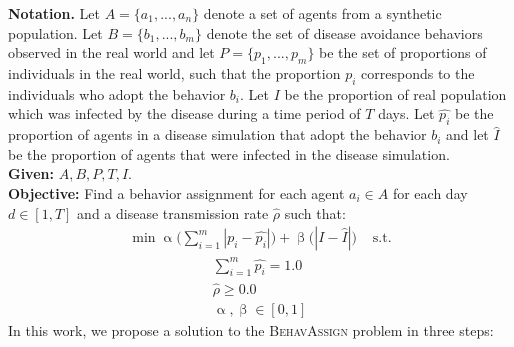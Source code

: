 \documentclass[doublespace]{VTthesis}
\begin{document}
    \textbf{Notation.}
    Let $A = \{a_1, ..., a_n\}$ denote a set of agents from a synthetic population. Let $B=\{b_1, ...,b_m\}$ denote the set of disease avoidance behaviors observed in the real world and let $P = \{p_1, ..., p_m\}$ be the set of proportions of individuals in the real world, such that the proportion $p_i$ corresponds to the individuals who adopt the behavior $b_i$. Let $I$ be the proportion of real population which was infected by the disease during a time period of $T$ days. Let $\hat{p_i}$ be the proportion of agents in a disease simulation that adopt the behavior $b_i$ and let $\hat{I}$ be the proportion of agents that were infected in the disease simulation.
    \\ \textbf{Given:} $A, B, P, T, I$. 
    \\ \textbf{Objective:} Find a behavior assignment for each agent $a_i \in A$ for each day $d \in [1,T]$ and a disease transmission rate $\hat{\rho}$ such that: 
    \begin{align}
    \label{obj-func}
        \min \upalpha \bigg(\sum_{i=1}^{m}|p_i - \hat{p_i}|\bigg) + \upbeta \bigg(|I - \hat{I}|\bigg) & \text{   s.t.} 
    \end{align}
    \vspace{-1cm}
    \begin{align*}
        \sum_{i=1}^{m} \hat{p_i} = 1.0 \\
        \hat{\rho} \ge 0.0\\
        \upalpha, \upbeta \in [0, 1]
    \end{align*}
    In this work, we propose a solution to the \textsc{BehavAssign} problem in three steps:
\end{document}
